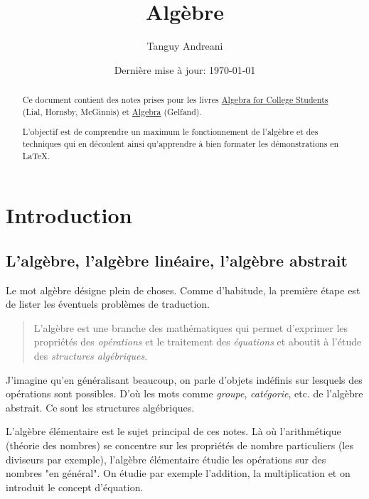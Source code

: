 \documentclass[fleqn,a4paper,nobib]{tufte-handout}
\title{Algèbre}
\author{Tanguy Andreani}
\date{Dernière mise à jour: \today}
\begin{document}
\maketitle

\begin{abstract}
    Ce document contient des notes prises pour les livres
    \underline{Algebra for College Students} (Lial, Hornsby, McGinnis)
    et \underline{Algebra} (Gelfand).
    
    L'objectif est de comprendre un maximum le fonctionnement
    de l'algèbre et des techniques qui en découlent ainsi
    qu'apprendre à bien formater les démonstrations en \LaTeX.
\end{abstract}

\tableofcontents

\section{Introduction}

\subsection{L'algèbre, l'algèbre linéaire, l'algèbre abstrait}



Le mot algèbre désigne plein de choses. Comme d'habitude, la
première étape est de lister les éventuels problèmes de traduction.

\begin{quote}
    L'algèbre est une branche des mathématiques qui permet d'exprimer les
    propriétés des \textit{opérations} et le traitement des \textit{équations}
    et aboutit à l'étude des \textit{structures algébriques}.
\end{quote}

J'imagine qu'en généralisant beaucoup, on parle d'objets indéfinis
sur lesquels des opérations sont possibles. D'où les mots comme
\textit{groupe}, \textit{catégorie}, etc. de l'algèbre abstrait.
Ce sont les structures algébriques.

L'algèbre élémentaire est le sujet principal de ces notes.
Là où l'arithmétique (théorie des nombres) se concentre sur les
propriétés de nombre particuliers (les diviseurs par exemple),
l'algèbre élémentaire étudie les opérations sur des nombres "en général".
On étudie par exemple l'addition, la multiplication et
on introduit le concept d'équation.
\end{document}
